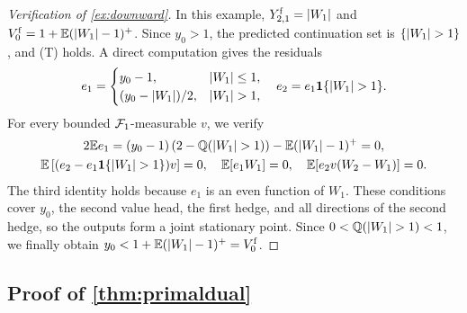 \begin{proof}[Verification of \cref{ex:downward}] In this example, $Y^{\mathrm f}_{2,1}=\lvert W_1\rvert$ and $V^{\mathrm f}_0=1+\mathbb{E}(\lvert W_1\rvert-1)^+$. Since $y_0>1$, the predicted continuation set is $\{\lvert W_1\rvert>1\}$, and (T) holds. A direct computation gives the residuals
\[
e_1=\begin{cases}y_0-1,&\lvert W_1\rvert\le1,\\(y_0-\lvert W_1\rvert)/2,&\lvert W_1\rvert>1,\end{cases}\quad e_2=e_1\mathbf{1}\{\lvert W_1\rvert>1\}.
\]
For every bounded $\mathcal{F}_1$-measurable $v$, we verify
\begin{gather*}
2\mathbb{E} e_1=(y_0-1)\left(2-\mathbb{Q}(\lvert W_1\rvert>1)\right)-\mathbb{E}(\lvert W_1\rvert-1)^+=0,\\
\mathbb{E}\left[(e_2-e_1\mathbf{1}\{\lvert W_1\rvert>1\})v\right]=0,\quad
\mathbb{E}[e_1W_1]=0,\quad\mathbb{E}[e_2v(W_2-W_1)]=0 .
\end{gather*}
The third identity holds because $e_1$ is an even function of $W_1$. These conditions cover $y_0$, the second value head, the first hedge, and all directions of the second hedge, so the outputs form a joint stationary point. Since $0<\mathbb{Q}(\lvert W_1\rvert>1)<1$, we finally obtain $y_0<1+\mathbb{E}(\lvert W_1\rvert-1)^+=V^{\mathrm f}_0$.
\end{proof}

\subsection{Proof of \texorpdfstring{\cref{thm:primaldual}}{Theorem 10}}\label{app:primaldual}

